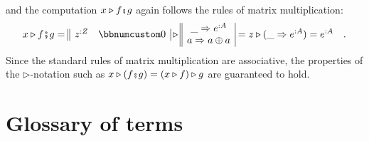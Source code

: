 and the computation $x\triangleright f\bef g$ again follows the rules
of matrix multiplication:
\[
x\triangleright f\bef g=\begin{array}{||cc|}
z^{:Z} & \bbnum 0\end{array}\triangleright\begin{array}{||c|}
\_\Rightarrow e^{:A}\\
a\Rightarrow a\oplus a
\end{array}=z\triangleright(\_\Rightarrow e^{:A})=e^{:A}\quad.
\]
Since the standard rules of matrix multiplication are associative,
the properties of the $\triangleright$-notation such as $x\triangleright(f\bef g)=(x\triangleright f)\triangleright g$
are guaranteed to hold.

\chapter{Glossary of terms\label{chap:Appendix-Glossary-of-terms}}

